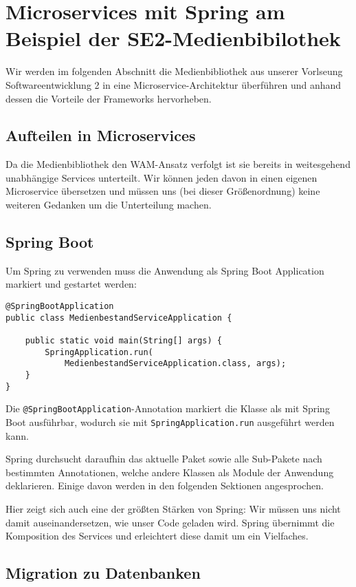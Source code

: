 \documentclass{article}
\begin{document}
\section{Microservices mit Spring am Beispiel der SE2-Medienbibilothek}

Wir werden im folgenden Abschnitt die Medienbibliothek aus unserer Vorlseung Softwareentwicklung 2 in eine Microservice-Architektur überführen und anhand dessen die Vorteile der Frameworks hervorheben.

\subsection{Aufteilen in Microservices}

Da die Medienbibliothek den WAM-Ansatz verfolgt ist sie bereits in weitesgehend unabhängige Services unterteilt.
 Wir können jeden davon in einen eigenen Microservice übersetzen und müssen uns (bei dieser Größenordnung) keine weiteren Gedanken um die Unterteilung machen.

\subsection{Spring Boot}

Um Spring zu verwenden muss die Anwendung als Spring Boot Application markiert und gestartet werden:

\begin{lstlisting}
@SpringBootApplication
public class MedienbestandServiceApplication {

    public static void main(String[] args) {
        SpringApplication.run(
        	MedienbestandServiceApplication.class, args);
    }
}
\end{lstlisting}

Die \texttt{@SpringBootApplication}-Annotation markiert die Klasse als mit Spring Boot ausführbar, wodurch sie mit \texttt{SpringApplication.run} ausgeführt werden kann.

Spring durchsucht daraufhin das aktuelle Paket sowie alle Sub-Pakete nach bestimmten Annotationen, welche andere Klassen als Module der Anwendung deklarieren.
 Einige davon werden in den folgenden Sektionen angesprochen.

Hier zeigt sich auch eine der größten Stärken von Spring: Wir müssen uns nicht damit auseinandersetzen, wie unser Code geladen wird.
 Spring übernimmt die Komposition des Services und erleichtert diese damit um ein Vielfaches.

\subsection{Migration zu Datenbanken}
\end{document}
